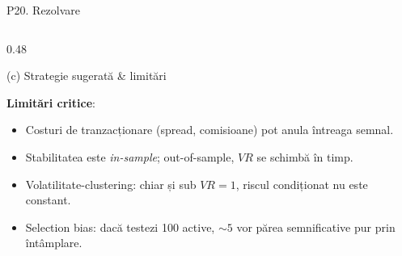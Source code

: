 \documentclass[9pt, aspectratio=169, t]{beamer}
\begin{document}
\begin{frame}[shrink=22]{P20. Rezolvare}
\begin{columns}[T]
\begin{column}{0.48\textwidth}
\begin{block}{(c) Strategie sugerată \& limitări}
\begin{itemize}
\end{itemize}
\textbf{Limitări critice}:
\begin{itemize}\setlength{\itemsep}{0pt}
\item Costuri de tranzacționare (spread, comisioane) pot anula întreaga semnal.
\item Stabilitatea este \emph{in-sample}; out-of-sample, $VR$ se schimbă în timp.
\item Volatilitate-clustering: chiar și sub $VR=1$, riscul condiționat nu este constant.
\item Selection bias: dacă testezi 100 active, $\sim 5$ vor părea semnificative pur prin întâmplare.
\end{itemize}
\end{block}
\end{column}
\end{columns}
\end{frame}
\end{document}
